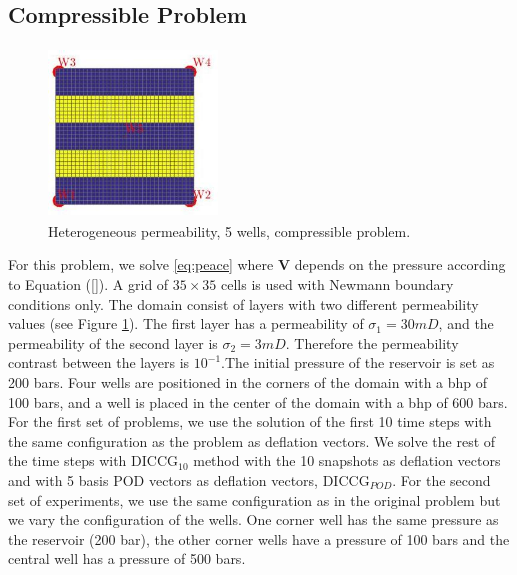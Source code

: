 \documentclass[12pt]{article}
\begin{document}
\newpage
\subsection*{Compressible Problem}

\begin{figure}
\centering 
\vspace{-10pt}
\includegraphics[width=4.5cm,height=4.5cm,keepaspectratio]{perm_comp.jpg}
 \vspace{-5pt}
\caption{ Heterogeneous permeability, 5 wells, compressible problem.}\label{fig:pc}
\vspace{-15pt}
\end{figure} 
For this problem, we solve \eqref{eq:peace} where $\mathbf{V}$ depends on the pressure according to Equation (\eqref{}). 
A grid of $35\times 35$ cells is used with Newmann boundary conditions only. The domain consist of layers with two different permeability values (see Figure \ref{fig:pc}). The first layer has a permeability of $\sigma_1 = 30mD$, and the permeability of the second layer is $\sigma_2 = 3mD$. Therefore the permeability contrast between the layers is $10^{-1}$.The initial pressure of the reservoir is set as 200 bars. Four wells are positioned in the corners of the domain with a bhp of 100 bars, and a well is placed in the center of the domain with a bhp of 600 bars.
 For the first set of problems, we use the solution of the first 10 time steps with the same configuration as the problem as deflation vectors. We solve the rest of the time steps with DICCG$_{10}$ method with the 10 snapshots as deflation vectors and with 5 basis POD vectors as deflation vectors, DICCG$_{POD}$.
 For the second set of experiments, we use the same configuration as in the original problem but we vary the configuration of the wells. One corner well has the same pressure as the reservoir (200 bar), the other corner wells have a pressure of 100 bars and the central well has a pressure of 500 bars. 
\end{document}
